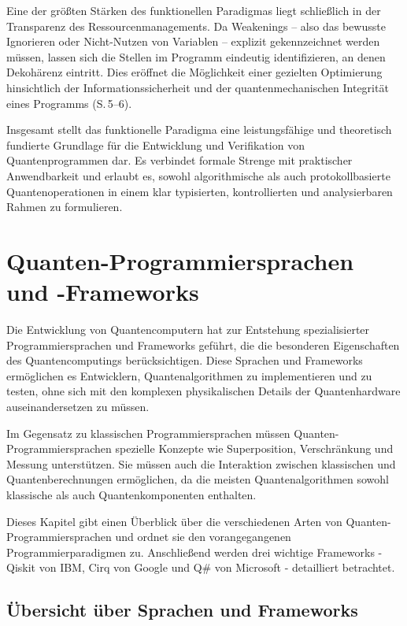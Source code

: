 Eine der größten Stärken des funktionellen Paradigmas liegt schließlich in der Transparenz des Ressourcenmanagements. Da Weakenings -- also das bewusste Ignorieren oder Nicht-Nutzen von Variablen -- explizit gekennzeichnet werden müssen, lassen sich die Stellen im Programm eindeutig identifizieren, an denen Dekohärenz eintritt. Dies eröffnet die Möglichkeit einer gezielten Optimierung hinsichtlich der Informationssicherheit und der quantenmechanischen Integrität eines Programms (S.\,5--6).

Insgesamt stellt das funktionelle Paradigma eine leistungsfähige und theoretisch fundierte Grundlage für die Entwicklung und Verifikation von Quantenprogrammen dar. Es verbindet formale Strenge mit praktischer Anwendbarkeit und erlaubt es, sowohl algorithmische als auch protokollbasierte Quantenoperationen in einem klar typisierten, kontrollierten und analysierbaren Rahmen zu formulieren.


\section{Quanten-Programmiersprachen und -Frameworks}
\label{sec:programming-languages}


Die Entwicklung von Quantencomputern hat zur Entstehung spezialisierter Programmiersprachen und Frameworks geführt, die die besonderen Eigenschaften des Quantencomputings berücksichtigen. Diese Sprachen und Frameworks ermöglichen es Entwicklern, Quantenalgorithmen zu implementieren und zu testen, ohne sich mit den komplexen physikalischen Details der Quantenhardware auseinandersetzen zu müssen.

Im Gegensatz zu klassischen Programmiersprachen müssen Quanten-Programmiersprachen spezielle Konzepte wie Superposition, Verschränkung und Messung unterstützen. Sie müssen auch die Interaktion zwischen klassischen und Quantenberechnungen ermöglichen, da die meisten Quantenalgorithmen sowohl klassische als auch Quantenkomponenten enthalten.

Dieses Kapitel gibt einen Überblick über die verschiedenen Arten von Quanten-Programmiersprachen und ordnet sie den vorangegangenen Programmierparadigmen zu. Anschließend werden drei wichtige Frameworks - Qiskit von IBM, Cirq von Google und Q\# von Microsoft - detailliert betrachtet.

\subsection{Übersicht über Sprachen und Frameworks}


